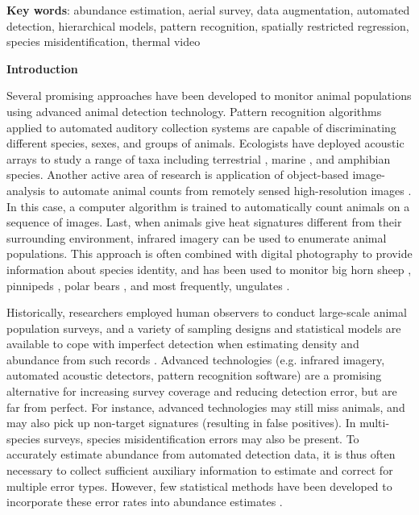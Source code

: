 \documentclass[12pt,fleqn]{article}
\begin{document}
\begin{flushleft}
{\bf Key words}: abundance estimation, aerial survey, data augmentation, automated detection, hierarchical models, pattern recognition, spatially restricted regression, species misidentification, thermal video

\vspace{.5 in}


\setlength{\baselineskip}{24pt}


{\bf Introduction}


\hspace{.5in}Several promising approaches have been developed to monitor animal populations using advanced animal detection technology.  Pattern recognition algorithms \citep[e.g.][]{KoganMargoliash1998} applied to automated auditory collection systems \citep[c.f.][]{BlumsteinEtAl2011} are capable of discriminating different species, sexes, and groups of animals.  Ecologists have deployed acoustic arrays to study a range of taxa including terrestrial \citep{BlumsteinEtAl2011}, marine \citep{MorettiEtAl2010,WardEtAl2012}, and amphibian \citep{WaddleEtAl2009} species. Another active area of research is application of object-based image-analysis to automate animal counts from remotely sensed high-resolution images \citep[see e.g.][]{GroomEtAl2013}.  In this case, a computer algorithm is trained to automatically count animals on a sequence of images. Last, when animals give heat signatures different from their surrounding environment, infrared imagery can be used to enumerate animal populations.  This approach is often combined with digital photography to provide information about species identity, and has been used to monitor
big horn sheep \citep{BernatasNelson2004}, pinnipeds \citep{ChernookEtAl1999,SpeckmanEtAl2011}, polar bears \citep{AmstrupEtAl2004}, and most frequently,  ungulates \citep[see e.g.][and references therein]{KissellEtAl2011,FrankeEtAl2012}.

\hspace{.5in}Historically, researchers employed human observers to conduct large-scale animal population surveys, and a variety of sampling designs and statistical models are available to cope with imperfect detection when estimating density and abundance from such records \citep[see e.g.][for a review]{WilliamsEtAl2002}.  Advanced technologies (e.g. infrared imagery, automated acoustic detectors,
pattern recognition software) are a promising alternative for increasing survey coverage
and reducing detection error, but are far from perfect. For instance, advanced technologies may still miss animals, and may also pick up non-target signatures (resulting in false positives).  In multi-species surveys, species misidentification errors may also be present. To accurately estimate abundance from automated detection data, it is thus often necessary to collect sufficient auxiliary information to estimate and correct for multiple error types.  However, few statistical methods have been developed to incorporate these error rates into abundance estimates \citep[but see][]{MarquesEtAl2013}.


\end{flushleft}
\end{document}
